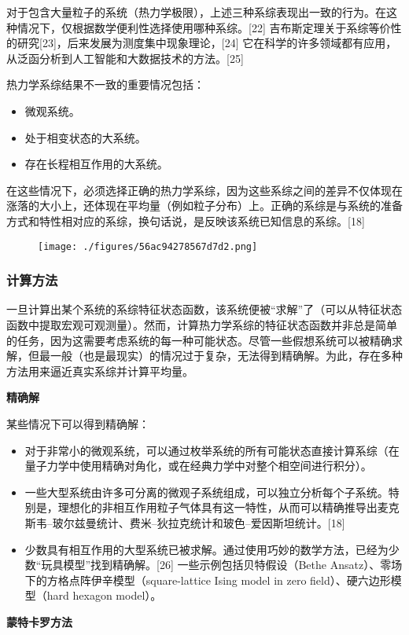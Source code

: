 对于包含大量粒子的系统（热力学极限），上述三种系综表现出一致的行为。在这种情况下，仅根据数学便利性选择使用哪种系综。[22] 吉布斯定理关于系综等价性的研究[23]，后来发展为测度集中现象理论，[24] 它在科学的许多领域都有应用，从泛函分析到人工智能和大数据技术的方法。[25]  

热力学系综结果不一致的重要情况包括：
\begin{itemize}
\item 微观系统。  
\item 处于相变状态的大系统。  
\item 存在长程相互作用的大系统。
\end{itemize}  
在这些情况下，必须选择正确的热力学系综，因为这些系综之间的差异不仅体现在涨落的大小上，还体现在平均量（例如粒子分布）上。正确的系综是与系统的准备方式和特性相对应的系综，换句话说，是反映该系统已知信息的系综。[18]
\begin{figure}[ht]
\centering
\texttt{[image: ./figures/56ac94278567d7d2.png]}
\caption{} \label{fig_TJLX_2}
\end{figure}
\subsubsection{计算方法}
一旦计算出某个系统的系综特征状态函数，该系统便被“求解”了（可以从特征状态函数中提取宏观可观测量）。然而，计算热力学系综的特征状态函数并非总是简单的任务，因为这需要考虑系统的每一种可能状态。尽管一些假想系统可以被精确求解，但最一般（也是最现实）的情况过于复杂，无法得到精确解。为此，存在多种方法用来逼近真实系综并计算平均量。

\textbf{精确解}

某些情况下可以得到精确解：
\begin{itemize}
\item 对于非常小的微观系统，可以通过枚举系统的所有可能状态直接计算系综（在量子力学中使用精确对角化，或在经典力学中对整个相空间进行积分）。
\item 一些大型系统由许多可分离的微观子系统组成，可以独立分析每个子系统。特别是，理想化的非相互作用粒子气体具有这一特性，从而可以精确推导出麦克斯韦–玻尔兹曼统计、费米–狄拉克统计和玻色–爱因斯坦统计。[18]
\item 少数具有相互作用的大型系统已被求解。通过使用巧妙的数学方法，已经为少数“玩具模型”找到精确解。[26] 一些示例包括贝特假设（Bethe Ansatz）、零场下的方格点阵伊辛模型（square-lattice Ising model in zero field）、硬六边形模型（hard hexagon model）。
\end{itemize}

\textbf{蒙特卡罗方法}

